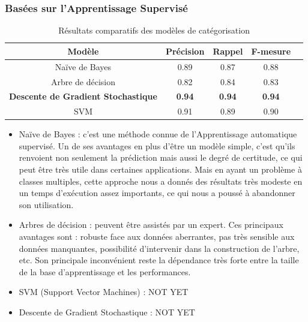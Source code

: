         \subsubsection{Basées sur l'Apprentissage Supervisé}
            \begin{table}[H]
                    \begin{center}
                        \begin{tabular}{|c|c|c|c|c}
                            \hline
                            \textbf{Modèle} & \textbf{Précision} & \textbf{Rappel} & \textbf{F-mesure} \\
                            \hline
                            Naïve de Bayes & 0.89 & 0.87 & 0.88 \\
                            Arbre de décision & 0.82 & 0.84 & 0.83 \\
                            \textbf{Descente de Gradient Stochastique} & \textbf{0.94} & \textbf{0.94} & \textbf{0.94} \\
                            SVM & 0.91 & 0.89 & 0.90 \\
                            \hline
                        \end{tabular}
                    \end{center}
                    \caption{Résultats comparatifs des modèles de catégorisation}
                    \label{modele-categ}
                \end{table}
            \begin{itemize}
                \item{Naïve de Bayes : }
                c'est une méthode connue de l'Apprentissage automatique supervisé. Un de ses avantages en plus d'être un modèle simple, c'est qu'ils renvoient non seulement la prédiction mais aussi le degré de certitude, ce qui peut être très utile dans certaines applications. Mais en ayant un problème à classes multiples, cette approche nous a donnés des résultats très modeste en un temps d'exécution assez importants, ce qui nous a poussé à abandonner son utilisation.\\

                \item{Arbres de décision : }
                peuvent être assistés par un expert. Ces principaux avantages sont : robuste face aux données aberrantes, pas très sensible aux données manquantes, possibilité d’intervenir dans la construction de l’arbre, etc. Son principale inconvénient reste la dépendance très forte entre la taille de la base d’apprentissage et les performances.\\

                \item{SVM (Support Vector Machines) : }
                NOT YET
                \item{Descente de Gradient Stochastique : }
                NOT YET
            \end{itemize}
                
